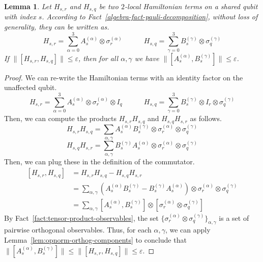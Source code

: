 \documentclass[11pt]{article}
\theoremstyle{plain}
\newtheorem{lemma}[theorem]{Lemma}
\newcommand{\eps}{\varepsilon}
\begin{document}
\begin{lemma}\label{lem:comm-propagates-down}
Let $H_{s, r}$ and $H_{s, q}$ be two $2$-local Hamiltonian terms on a shared qubit with index $s$. According to Fact~\ref{algebra-fact-pauli-decomposition}, without loss of generality, they can be written as.
    \begin{equation}
        H_{s,r} = \sum\limits_{\alpha = 0}^{3} A_s^{(\alpha)} \otimes \sigma_r^{(\alpha)} \quad\quad\quad H_{s,q} = \sum\limits_{\gamma = 0}^{3} B_s^{(\gamma)} \otimes \sigma_q^{(\gamma)}
    \end{equation}
If $\|[H_{s, r}, H_{s, q}]\| \leq \eps$, then for all $\alpha, \gamma$ we have $\|[A_s^{(\alpha)}, B_s^{(\gamma)}]\| \leq \eps$.
\end{lemma}
\begin{proof}
We can re-write the Hamiltonian terms with an identity factor on the unaffected qubit.
    \begin{equation}
        H_{s,r} = \sum\limits_{\alpha = 0}^{3} A_s^{(\alpha)} \otimes \sigma_r^{(\alpha)} \otimes I_{q}\quad\quad\quad H_{s,q} = \sum\limits_{\gamma = 0}^{3} B_s^{(\gamma)} \otimes I_r \otimes \sigma_q^{(\gamma)}
    \end{equation}
Then, we can compute the products $H_{s,r} H_{s,q}$ and $H_{s,q} H_{s,r}$ as follows.
\begin{equation}
    H_{s,r} H_{s,q} = \sum\limits_{\alpha, \gamma} A_s^{(\alpha)} B_s^{(\gamma)} \otimes \sigma_r^{(\alpha)} \otimes \sigma_q^{(\gamma)}
\end{equation}
\begin{equation}
    H_{s,q} H_{s,r} = \sum\limits_{\alpha, \gamma}  B_s^{(\gamma)} A_s^{(\alpha)} \otimes \sigma_r^{(\alpha)} \otimes \sigma_q^{(\gamma)}
\end{equation}
Then, we can plug these in the definition of the commutator.
\begin{align*}
    \left[H_{s,r}, H_{s,q}\right] &= H_{s,r} H_{s,q} - H_{s,q} H_{s,r}\\
    &= \sum\limits_{\alpha, \gamma} \left(A_s^{(\alpha)} B_s^{(\gamma)} - B_s^{(\gamma)} A_s^{(\alpha)}\right) \otimes \sigma_r^{(\alpha)} \otimes \sigma_q^{(\gamma)}\\
    &= \sum\limits_{\alpha, \gamma} \left[A_s^{(\alpha)}, B_s^{(\gamma)} \right] \otimes \left[\sigma_r^{(\alpha)} \otimes \sigma_q^{(\gamma)}\right]
\end{align*}
By Fact~\ref{fact:tensor-product-observables}, the set $\{\sigma_r^{(\alpha)} \otimes \sigma_q^{(\gamma)}\}_{\alpha,\gamma}$ is a set of pairwise orthogonal observables. Thus, for each $\alpha, \gamma$, we can apply Lemma~\ref{lem:opnorm-orthog-components} to conclude that $\|[A_s^{(\alpha)}, B_s^{(\gamma)}]\| \leq \|[H_{s, r}, H_{s, q}]\| \leq \eps$.
\end{proof}
\end{document}
